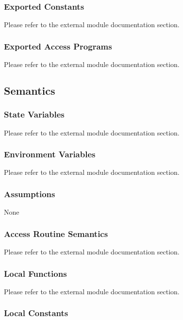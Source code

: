 \documentclass[12pt, titlepage]{article}
\begin{document}
\subsubsection{Exported Constants}

Please refer to the external module documentation section.

\subsubsection{Exported Access Programs}

Please refer to the external module documentation section.

\subsection{Semantics}

\subsubsection{State Variables}

Please refer to the external module documentation section.

\subsubsection{Environment Variables}

Please refer to the external module documentation section.

\subsubsection{Assumptions}

None

\subsubsection{Access Routine Semantics}

Please refer to the external module documentation section.

\subsubsection{Local Functions}

Please refer to the external module documentation section.

\subsubsection{Local Constants}
\end{document}
